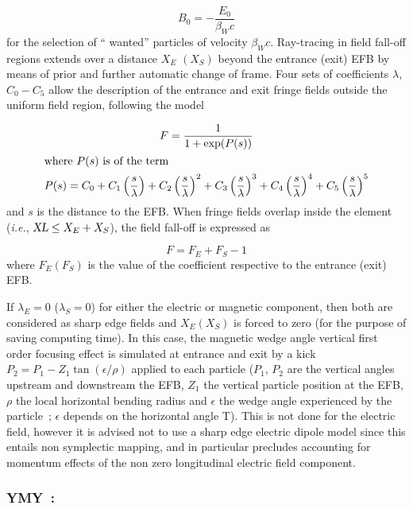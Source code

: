 { $$ B_0= - \dfrac{E_0 }{ \beta_ Wc} $$
%
 for the selection of `` wanted''  particles of velocity $\beta_Wc $. Ray-tracing in 
field fall-off regions extends over a distance $ X_E $ $ (X_S) $ beyond the
entrance (exit) EFB by means of prior and further automatic change of frame. Four sets
of coefficients $\lambda$, $ C_0-C_5 $ allow the description of the entrance and exit fringe 
fields outside the uniform field region, following the model~\cite{Biblio12} %

\begin{gather*}
	F = \dfrac{1 }{ 1+ \exp(P(s))} \\
	\intertext{where $  P(s) $ is of the term}
	    P(s) = C_0
	       +C_1 \left(  \dfrac{s }{ \lambda} \right) 
	       +C_2 \left( \dfrac{s }{ \lambda} \right)^2 
	       + C_3 \left( \dfrac{s }{ \lambda} \right)^3 
	       +C_4 \left( \dfrac{s }{ \lambda} \right)^4 
	       + C_5 \left(\dfrac{s }{ \lambda} \right)^5 
\end{gather*}
%
and $ s $ is the distance to the EFB.  When fringe fields overlap
inside the element (\emph{i.e.}, $ \textsl{XL}\leq X_E+X_S$),  the field fall-off is expressed as

$$ F = F_E + F_S -1 $$
%
 where $ F_E(F_S) $ is the value of the coefficient respective to the entrance (exit) EFB. 
 
\noindent If $ \lambda_ E=0 $  ($\lambda_ S=0$)  for either the electric or
magnetic component, then both are considered as sharp edge fields and $ X_E(X_S) $ is forced 
to zero (for the purpose of saving computing time).  In this case, the magnetic wedge angle vertical first order focusing effect is simulated at entrance and exit by a kick $P_2 = P_1 - Z_1 \tan (\epsilon / \rho)$ applied to each particle ($P_1$, $P_2$ are the vertical angles upstream and downstream the EFB, $Z_1$ the vertical particle position at the EFB, $\rho$ the local horizontal bending radius and $\epsilon$ the wedge angle experienced by the particle~; $\epsilon$ depends on the horizontal angle T). This is not done for the electric field, however it is advised not to use a sharp edge electric dipole model since this entails non symplectic mapping, and in particular precludes accounting for momentum effects of the non zero longitudinal electric field component.

\newpage

\subsubsection*{YMY~: \YMYTitl} \label{YMY} 
\medskip 

}
